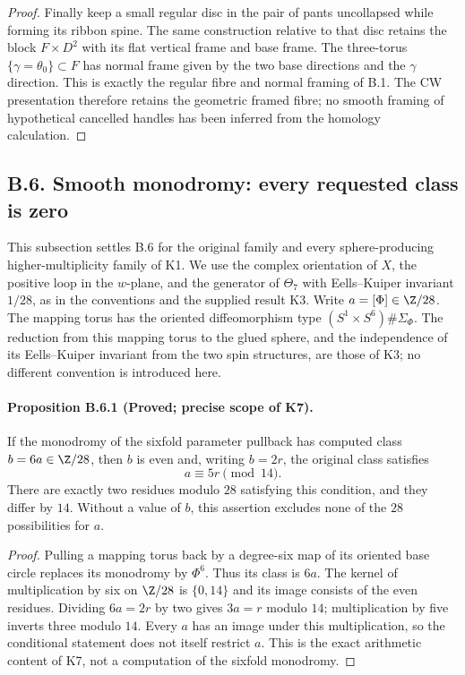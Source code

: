 \begin{proof}
Finally keep a small regular disc in the pair of
pants uncollapsed while forming its ribbon spine.
The same construction relative to that disc retains
the block $F\times D^2$ with its flat vertical
frame and base frame.  The three-torus
$\{\gamma=\theta_0\}\subset F$ has normal frame
given by the two base directions and the
$\gamma$ direction.  This is exactly the regular
fibre and normal framing of B.1.  The CW
presentation therefore retains the geometric
framed fibre; no smooth framing of hypothetical
cancelled handles has been inferred from the
homology calculation.
\end{proof}

\subsection{B.6. Smooth monodromy: every requested class is zero}

This subsection settles B.6 for the original family and every
sphere-producing higher-multiplicity family of K1. We use the complex
orientation of $X$, the positive loop in the $w$-plane, and the generator
of $\Theta_7$ with Eells--Kuiper invariant $1/28$, as in the conventions
and the supplied result K3. Write $a=[\Phi]\in\Z/28$. The mapping torus
has the oriented diffeomorphism type $(S^1\times S^6)\#\Sigma_\Phi$.
The reduction from this mapping torus to the glued sphere, and the
independence of its Eells--Kuiper invariant from the two spin structures,
are those of K3; no different convention is introduced here.

\paragraph{Proposition B.6.1 (Proved; precise scope of K7).}
If the monodromy of the sixfold parameter pullback has computed class
$b=6a\in\Z/28$, then $b$ is even and, writing $b=2r$, the original
class satisfies
\[
 a\equiv5r\pmod {14}.
\]
There are exactly two residues modulo $28$ satisfying this condition,
and they differ by $14$. Without a value of $b$, this assertion excludes
none of the $28$ possibilities for $a$.
\begin{proof}
Pulling a mapping torus back by a degree-six map of its oriented base
circle replaces its monodromy by $\Phi^6$. Thus its class is $6a$.
The kernel of multiplication by six on $\Z/28$ is $\{0,14\}$ and
its image consists of the even residues. Dividing $6a=2r$ by two gives
$3a=r$ modulo $14$; multiplication by five inverts three modulo $14$.
Every $a$ has an image under this multiplication, so the conditional
statement does not itself restrict $a$. This is the exact arithmetic
content of K7, not a computation of the sixfold monodromy.
\end{proof}

